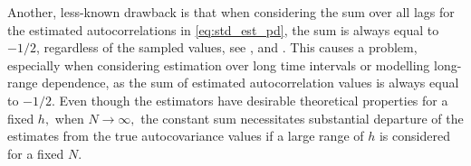 
Another, less-known drawback is that when considering the sum over all lags for the estimated autocorrelations in \eqref{eq:std_est_pd}, the sum is always equal to \(-1/2\), regardless of the sampled values, see \cite{Hassani2009}, \citet{Hassani2012} and \cite{Bilchouris_Olenko_2025}. This causes a problem, especially when considering estimation over long time intervals or modelling long-range dependence, as the sum of estimated autocorrelation values is always equal to \(-1/2\).
Even though the estimators have desirable theoretical properties for a fixed \(h,\) when \(N  \rightarrow \infty ,\) the constant sum necessitates substantial departure of the estimates from the true autocovariance values if a large range of \(h\) is considered for a fixed \(N.\)


